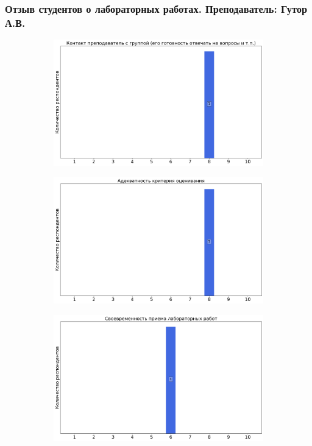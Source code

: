     \subsubsection{Отзыв студентов о лабораторных работах. Преподаватель: Гутор А.В.}
		\begin{figure}[H]
			\centering
			\begin{subfigure}[b]{0.45\textwidth}
				\centering
				\includegraphics[width=\textwidth]{images/3 course/Аналоговая электроника/labniks-marks-Гутор А.В.-0.png}
			\end{subfigure}
			\begin{subfigure}[b]{0.45\textwidth}
				\centering
				\includegraphics[width=\textwidth]{images/3 course/Аналоговая электроника/labniks-marks-Гутор А.В.-1.png}
			\end{subfigure}
			\begin{subfigure}[b]{0.45\textwidth}
				\centering
				\includegraphics[width=\textwidth]{images/3 course/Аналоговая электроника/labniks-marks-Гутор А.В.-2.png}

\end{subfigure}
\end{figure}

